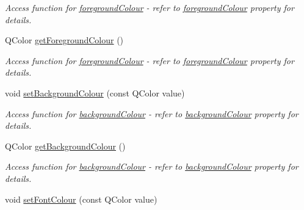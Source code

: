 \begin{DoxyCompactItemize}
\begin{DoxyCompactList}\small\item\em Access function for \hyperlink{classQEAnalogIndicator_a8a9d5b7e1181aeddf3a7022ebff74126}{foregroundColour} -\/ refer to \hyperlink{classQEAnalogIndicator_a8a9d5b7e1181aeddf3a7022ebff74126}{foregroundColour} property for details. \end{DoxyCompactList}\item 
\hypertarget{classQEAnalogIndicator_acfa92a843a874e54cdd29cc819340687}{
QColor \hyperlink{classQEAnalogIndicator_acfa92a843a874e54cdd29cc819340687}{getForegroundColour} ()}
\label{classQEAnalogIndicator_acfa92a843a874e54cdd29cc819340687}

\begin{DoxyCompactList}\small\item\em Access function for \hyperlink{classQEAnalogIndicator_a8a9d5b7e1181aeddf3a7022ebff74126}{foregroundColour} -\/ refer to \hyperlink{classQEAnalogIndicator_a8a9d5b7e1181aeddf3a7022ebff74126}{foregroundColour} property for details. \end{DoxyCompactList}\item 
\hypertarget{classQEAnalogIndicator_a0d42ef3aa11c005f1da8116d1ea265ad}{
void \hyperlink{classQEAnalogIndicator_a0d42ef3aa11c005f1da8116d1ea265ad}{setBackgroundColour} (const QColor value)}
\label{classQEAnalogIndicator_a0d42ef3aa11c005f1da8116d1ea265ad}

\begin{DoxyCompactList}\small\item\em Access function for \hyperlink{classQEAnalogIndicator_a57c6c5f75b77abe25fc6c01803a4c03d}{backgroundColour} -\/ refer to \hyperlink{classQEAnalogIndicator_a57c6c5f75b77abe25fc6c01803a4c03d}{backgroundColour} property for details. \end{DoxyCompactList}\item 
\hypertarget{classQEAnalogIndicator_a191218338a740044854d431aa02b3ac1}{
QColor \hyperlink{classQEAnalogIndicator_a191218338a740044854d431aa02b3ac1}{getBackgroundColour} ()}
\label{classQEAnalogIndicator_a191218338a740044854d431aa02b3ac1}

\begin{DoxyCompactList}\small\item\em Access function for \hyperlink{classQEAnalogIndicator_a57c6c5f75b77abe25fc6c01803a4c03d}{backgroundColour} -\/ refer to \hyperlink{classQEAnalogIndicator_a57c6c5f75b77abe25fc6c01803a4c03d}{backgroundColour} property for details. \end{DoxyCompactList}\item 
\hypertarget{classQEAnalogIndicator_a7737fc197aa344c303c61b5a7fce9817}{
void \hyperlink{classQEAnalogIndicator_a7737fc197aa344c303c61b5a7fce9817}{setFontColour} (const QColor value)}
\label{classQEAnalogIndicator_a7737fc197aa344c303c61b5a7fce9817}


\end{DoxyCompactItemize}
